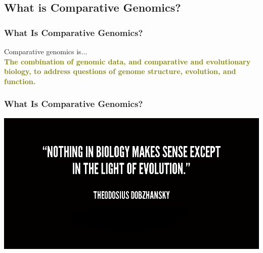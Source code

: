 
\subsection{What is Comparative Genomics?}



%
\begin{frame}
  \frametitle{What Is Comparative Genomics?}
  Comparative genomics is$\ldots$ \\
  \Large{
    \textcolor{olive}{
      \textbf{
      The combination of genomic data, and comparative and evolutionary biology, to address questions of   genome structure, evolution, and function.
      }
    }
  }
\end{frame}

%
\begin{frame}
  \frametitle{What Is Comparative Genomics?}
  \begin{center}
    \includegraphics[width=\textwidth]{images/dobzhansky_quote}
  \end{center}  
\end{frame}